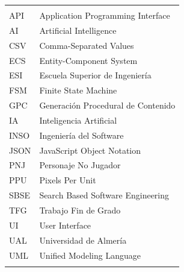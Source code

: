 \begin{tabular}{ l | l }
    & \\
    API  & Application Programming Interface \\
    AI   & Artificial Intelligence \\
    CSV  & Comma-Separated Values \\
    ECS  & Entity-Component System \\
    ESI  & Escuela Superior de Ingeniería \\
    FSM  & Finite State Machine \\
    GPC  & Generación Procedural de Contenido \\
    IA   & Inteligencia Artificial \\
    INSO & Ingeniería del Software \\
    JSON & JavaScript Object Notation \\
    PNJ  & Personaje No Jugador \\
    PPU  & Pixels Per Unit \\
    SBSE & Search Based Software Engineering \\
    TFG  & Trabajo Fin de Grado \\
    UI   & User Interface \\
    UAL  & Universidad de Almería \\
    UML  & Unified Modeling Language \\
    & \\
\end{tabular}

\clearpage
